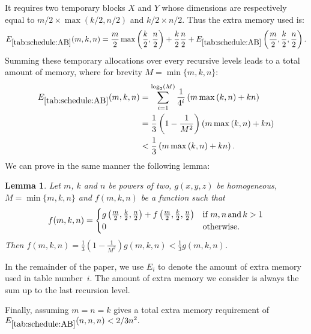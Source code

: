 \documentclass{article}
\newtheorem{lem}{Lemma}
\begin{document}
It requires two temporary blocks $X$ and $Y$ whose dimensions are respectively equal to
$m/2\times \max(k/2, n/2)$ and $k/2 \times n/2$.
Thus the extra memory used is:
$$E_{\ref{tab:schedule:AB}}(m,k,n)= \frac{m}{2} \max{\left(\frac{k}{2}, \frac{n}{2}\right)} + \frac{k}{2} \frac{n}{2}+ E_{\ref{tab:schedule:AB}}\left(\frac{m}{2}, \frac{k}{2}, \frac{n}{2}\right).$$
Summing these temporary allocations over every recursive levels leads to a total amount of memory, where for brevity $M = \min{\{m,k,n\}}$:
\begin{align}
	E_{\ref{tab:schedule:AB}}(m,k,n) & = \sum_{i=1}^{\log_2(M)} \frac{1}{4^i}  \left(m \max{(k,n)} + k n\right) \label{Eq:schedule:AB} \\
	& = \frac{1}{3} \left( 1 - \frac{1}{M^2}\right) \left(m \max{(k,n)} + k n\right) \notag \\
	& < \frac{1}{3}  \left(m \max{(k,n)} + k n\right). \notag
\end{align}
We can prove in the same manner the following lemma:
\begin{lem}\label{lem:sum}
	Let $m$, $k$ and $n$  be powers of two, $g(x,y,z)$ be homogeneous, $M =  \min{\{m,k,n\}}$ and $f(m,k,n)$ be a function such that 
	$$f(m,k,n) = \begin{cases} 
		g\left(\frac{m}{2}, \frac{k}{2}, \frac{n}{2}\right) + f\left(\frac{m}{2}, \frac{k}{2}, \frac{n}{2}\right)	& \text{if\ } m\text{,\,}n\text{\,and\,}k > 1\\
		0																& \text{{otherwise.}}
	\end{cases}$$ 
Then $f\left(m,k,n\right) = \frac{1}{3}  \left( 1 - \frac{1}{M^2}\right) g(m,k,n)< \frac{1}{3} g(m,k,n)$.
\end{lem}
In the remainder of the paper, we use $E_i$ to denote the amount of extra memory used in table number~$i$. The amount of extra memory we consider is always the sum up to the last recursion level.


Finally, assuming $m=n=k$  gives a total extra memory requirement of
$E_{\ref{tab:schedule:AB}}(n,n,n) < 2/3 n^2.$
\end{document}
